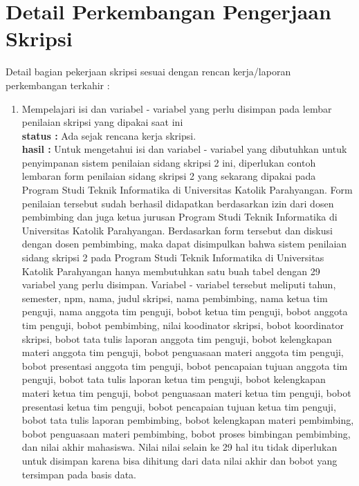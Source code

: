\documentclass[a4paper,twoside]{article}
\begin{document}
\section{Detail Perkembangan Pengerjaan Skripsi}
Detail bagian pekerjaan skripsi sesuai dengan rencan kerja/laporan perkembangan terkahir :
	\begin{enumerate}
		\item Mempelajari isi dan variabel - variabel yang perlu disimpan pada lembar penilaian skripsi yang dipakai saat ini \\
		{\bf status :} Ada sejak rencana kerja skripsi.\\
		{\bf hasil :} Untuk mengetahui isi dan variabel - variabel yang dibutuhkan untuk penyimpanan sistem penilaian sidang skripsi 2 ini, diperlukan contoh lembaran form penilaian sidang skripsi 2 yang sekarang dipakai pada Program Studi Teknik Informatika di Universitas Katolik Parahyangan. Form penilaian tersebut sudah berhasil didapatkan berdasarkan izin dari dosen pembimbing dan juga ketua jurusan Program Studi Teknik Informatika di Universitas Katolik Parahyangan. Berdasarkan form tersebut dan diskusi dengan dosen pembimbing, maka dapat disimpulkan bahwa sistem penilaian sidang skripsi 2 pada Program Studi Teknik Informatika di Universitas Katolik Parahyangan hanya membutuhkan satu buah tabel dengan 29 variabel yang perlu disimpan. Variabel - variabel tersebut meliputi tahun, semester, npm, nama, judul skripsi, nama pembimbing, nama ketua tim penguji, nama anggota tim penguji, bobot ketua tim penguji, bobot anggota tim penguji, bobot pembimbing, nilai koodinator skripsi, bobot koordinator skripsi, bobot tata tulis laporan anggota tim penguji, bobot kelengkapan materi anggota tim penguji, bobot penguasaan materi anggota tim penguji, bobot presentasi anggota tim penguji, bobot pencapaian tujuan anggota tim penguji, bobot tata tulis laporan ketua tim penguji, bobot kelengkapan materi ketua tim penguji, bobot penguasaan materi ketua tim penguji, bobot presentasi ketua tim penguji, bobot pencapaian tujuan ketua tim penguji, bobot tata tulis laporan pembimbing, bobot kelengkapan materi pembimbing, bobot penguasaan materi pembimbing, bobot proses bimbingan pembimbing, dan nilai akhir mahasiswa. Nilai nilai selain ke 29 hal itu tidak diperlukan untuk disimpan karena bisa dihitung dari data nilai akhir dan bobot yang tersimpan pada basis data.
		

\end{enumerate}
\end{document}
